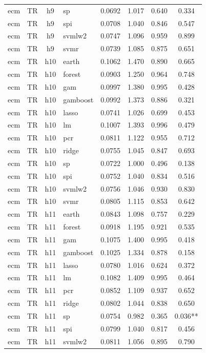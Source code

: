 \begin{ThreePartTable}
\begin{longtable}[t]{llclcccc}
ecm & TR & h9 & sp & 0.0692 & 1.017 & 0.640 & 0.334\\
ecm & TR & h9 & spi & 0.0708 & 1.040 & 0.846 & 0.547\\
ecm & TR & h9 & svmlw2 & 0.0747 & 1.096 & 0.959 & 0.899\\
ecm & TR & h9 & svmr & 0.0739 & 1.085 & 0.875 & 0.651\\
\addlinespace
ecm & TR & h10 & earth & 0.1062 & 1.470 & 0.890 & 0.665\\
ecm & TR & h10 & forest & 0.0903 & 1.250 & 0.964 & 0.748\\
ecm & TR & h10 & gam & 0.0997 & 1.380 & 0.995 & 0.428\\
ecm & TR & h10 & gamboost & 0.0992 & 1.373 & 0.886 & 0.321\\
ecm & TR & h10 & lasso & 0.0741 & 1.026 & 0.699 & 0.453\\
ecm & TR & h10 & lm & 0.1007 & 1.393 & 0.996 & 0.479\\
ecm & TR & h10 & pcr & 0.0811 & 1.122 & 0.955 & 0.712\\
ecm & TR & h10 & ridge & 0.0755 & 1.045 & 0.847 & 0.693\\
ecm & TR & h10 & sp & 0.0722 & 1.000 & 0.496 & 0.138\\
ecm & TR & h10 & spi & 0.0752 & 1.040 & 0.834 & 0.516\\
ecm & TR & h10 & svmlw2 & 0.0756 & 1.046 & 0.930 & 0.830\\
ecm & TR & h10 & svmr & 0.0805 & 1.115 & 0.853 & 0.642\\
\addlinespace
ecm & TR & h11 & earth & 0.0843 & 1.098 & 0.757 & 0.229\\
ecm & TR & h11 & forest & 0.0918 & 1.195 & 0.921 & 0.535\\
ecm & TR & h11 & gam & 0.1075 & 1.400 & 0.995 & 0.418\\
ecm & TR & h11 & gamboost & 0.1025 & 1.334 & 0.878 & 0.158\\
ecm & TR & h11 & lasso & 0.0780 & 1.016 & 0.624 & 0.372\\
ecm & TR & h11 & lm & 0.1082 & 1.409 & 0.995 & 0.464\\
ecm & TR & h11 & pcr & 0.0852 & 1.109 & 0.937 & 0.652\\
ecm & TR & h11 & ridge & 0.0802 & 1.044 & 0.838 & 0.650\\
ecm & TR & h11 & sp & 0.0754 & 0.982 & 0.365 & 0.036**\\
ecm & TR & h11 & spi & 0.0799 & 1.040 & 0.817 & 0.456\\
ecm & TR & h11 & svmlw2 & 0.0811 & 1.056 & 0.895 & 0.790\\

\end{longtable}
\end{ThreePartTable}
